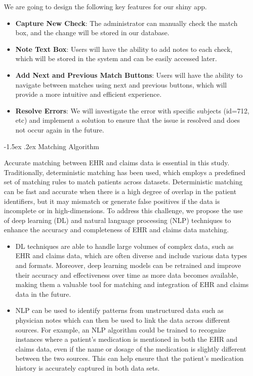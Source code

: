 \documentclass[11pt,]{article}
\makeatletter
\providecommand{\tightlist}{%
  \setlength{\itemsep}{0pt}\setlength{\parskip}{0pt}}
\renewcommand\paragraph{
  \@startsection{paragraph}{4}{\z@}
    {-0.5ex\@plus -1ex \@minus -.2ex}%
    {-1.5ex \@plus .2ex}%
    {\normalfont\normalsize\bf}} %
\makeatother
\begin{document}
We are going to design the following key features for our shiny app.

\begin{itemize}
\tightlist
\item
  \textbf{Capture New Check}: The administrator can manually check the
  match box, and the change will be stored in our database.
\item
  \textbf{Note Text Box}: Users will have the ability to add notes to
  each check, which will be stored in the system and can be easily
  accessed later.
\item
  \textbf{Add Next and Previous Match Buttons}: Users will have the
  ability to navigate between matches using next and previous buttons,
  which will provide a more intuitive and efficient experience.
\item
  \textbf{Resolve Errors}: We will investigate the error with specific
  subjects (id=712, etc) and implement a solution to ensure that the
  issue is resolved and does not occur again in the future.
\end{itemize}

\paragraph{Matching Algorithm}\label{matching-algorithm}

Accurate matching between EHR and claims data is essential in this
study. Traditionally, deterministic matching has been used, which
employs a predefined set of matching rules to match patients across
datasets. Deterministic matching can be fast and accurate when there is
a high degree of overlap in the patient identifiers, but it may mismatch
or generate false positives if the data is incomplete or in
high-dimensions. To address this challenge, we propose the use of deep
learning (DL) and natural language processing (NLP) techniques to
enhance the accuracy and completeness of EHR and claims data matching.

\begin{itemize}
\tightlist
\item
  DL techniques are able to handle large volumes of complex data, such
  as EHR and claims data, which are often diverse and include various
  data types and formats. Moreover, deep learning models can be
  retrained and improve their accuracy and effectiveness over time as
  more data becomes available, making them a valuable tool for matching
  and integration of EHR and claims data in the future.
\item
  NLP can be used to identify patterns from unstructured data such as
  physician notes which can then be used to link the data across
  different sources. For example, an NLP algorithm could be trained to
  recognize instances where a patient's medication is mentioned in both
  the EHR and claims data, even if the name or dosage of the medication
  is slightly different between the two sources. This can help ensure
  that the patient's medication history is accurately captured in both
  data sets.
\end{itemize}
\end{document}
